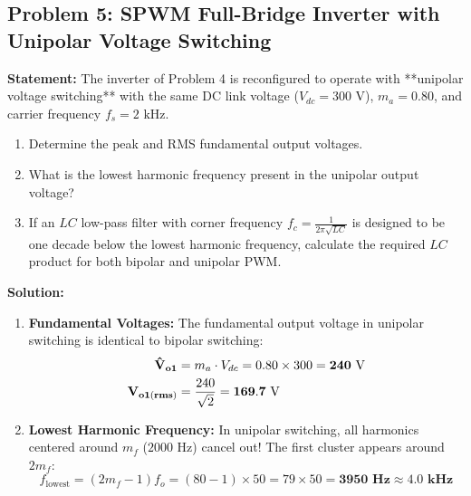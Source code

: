 \documentclass[11pt,a4paper]{article}
\begin{document}
\subsection{Problem 5: SPWM Full-Bridge Inverter with Unipolar Voltage Switching}
\begin{examplebox}
\textbf{Statement:} The inverter of Problem 4 is reconfigured to operate with **unipolar voltage switching** with the same DC link voltage ($V_{dc} = 300\text{ V}$), $m_a = 0.80$, and carrier frequency $f_s = 2\text{ kHz}$.
\begin{enumerate}
  \item Determine the peak and RMS fundamental output voltages.
  \item What is the lowest harmonic frequency present in the unipolar output voltage?
  \item If an $LC$ low-pass filter with corner frequency $f_c = \frac{1}{2\pi\sqrt{LC}}$ is designed to be one decade below the lowest harmonic frequency, calculate the required $LC$ product for both bipolar and unipolar PWM.
\end{enumerate}

\tcblower
\textbf{Solution:}
\begin{enumerate}
  \item \textbf{Fundamental Voltages:}
  The fundamental output voltage in unipolar switching is identical to bipolar switching:
  \begin{align*}
  \mathbf{\hat{V}_{o1}} &= m_a \cdot V_{dc} = 0.80 \times 300 = \mathbf{240\text{ V}} \notag\\
  \mathbf{V_{o1(rms)}} &= \frac{240}{\sqrt{2}} = \mathbf{169.7\text{ V}}
  \end{align*}

  \item \textbf{Lowest Harmonic Frequency:}
  In unipolar switching, all harmonics centered around $m_f$ ($2000\text{ Hz}$) cancel out! The first cluster appears around $2m_f$:
  \begin{equation*}
  f_{\text{lowest}} = (2m_f - 1) f_o = (80 - 1) \times 50 = 79 \times 50 = \mathbf{3950\text{ Hz}} \approx \mathbf{4.0\text{ kHz}}
  \end{equation*}


\end{enumerate}
\end{examplebox}
\end{document}
